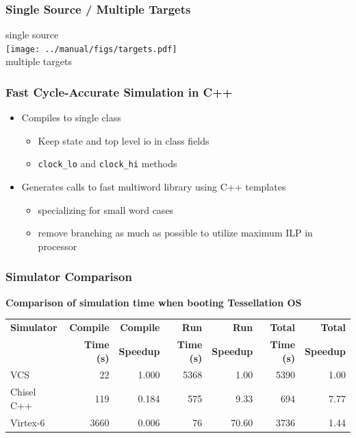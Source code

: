 \documentclass[xcolor=pdflatex,dvipsnames,table]{beamer}
\begin{document}
\ifx\poster\undefined
\begin{frame}[fragile]
\frametitle{Single Source / Multiple Targets}

\begin{center}
single source \\
\texttt{[image: ../manual/figs/targets.pdf]} \\
multiple targets \
\end{center}

\end{frame}
\fi

\begin{frame}[fragile]
\frametitle{Fast Cycle-Accurate Simulation in C++}

\begin{itemize}
\item Compiles to single class 
\begin{itemize}
\item Keep state and top level io in class fields
\item \verb+clock_lo+ and \verb+clock_hi+ methods
\end{itemize}
\item Generates calls to fast multiword library using C++ templates 
\begin{itemize}
\item specializing for small word cases
\item remove branching as much as possible to utilize maximum ILP in processor
\end{itemize}
\end{itemize}

\end{frame}

\begin{frame}[fragile]
\frametitle{Simulator Comparison}

\textbf{Comparison of simulation time when booting Tessellation OS}
\vskip0.5cm

\begin{footnotesize}
\begin{tabular}{lrrrrrr}
\textbf{Simulator} & \textbf{Compile}  & \textbf{Compile} & \textbf{Run}  & \textbf{Run} & \textbf{Total} & \textbf{Total} \\
& \textbf{Time (s)}  & \textbf{Speedup} & \textbf{Time (s)}  & \textbf{Speedup} & \textbf{Time (s)} & \textbf{Speedup} \\
\hline
VCS             &   22 & 1.000 & 5368 & 1.00 & 5390 & 1.00 \\ 
Chisel C++  & 119 & 0.184 & 575 & 9.33 & 694 & 7.77\\
Virtex-6 & 3660 & 0.006 & 76 & 70.60 & 3736 & 1.44\\
\end{tabular}
\end{footnotesize}


\end{frame}
\end{document}
